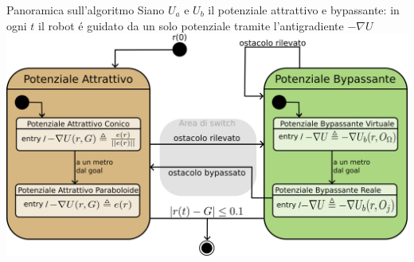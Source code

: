 \documentclass[handout]{beamer}
\begin{document}
\begin{frame}{Panoramica sull'algoritmo}	
\centering
Siano $U_a$ e $U_b$ il potenziale attrattivo e bypassante: in ogni $t$ il robot é guidato da un solo potenziale tramite l'antigradiente $-\nabla U$ \\
\vspace*{5mm}
\includegraphics{statechart.png}
\end{frame}
\end{document}
